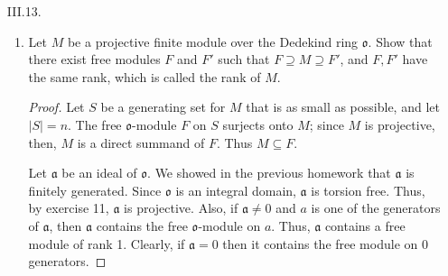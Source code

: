 \documentclass[10pt]{article}
\renewcommand{\a}{\mathfrak{a}}
\renewcommand{\o}{\mathfrak{o}}
\begin{document}
\begin{enumerate}
\begin{enumerate}
\begin{proof}
Consider $\a^{-1} \rightarrow a^{\vee}$ given by $b \mapsto m_b$, which is clearly injective.  If $f \in \a^{\vee}$, then by the argument in (b) we know $f = m_c$ where $c = a^{-1}f(a)$.  Since $\a^{-1}$ is an $\o$-module, and $f(a) \in \o$, we have $c \in \a^{-1}$.  So we have an isomorphism $\a^{-1} \cong a^{\vee}$.  Therefore, $\a = (\a^{-1})^{-1} \cong \a^{\vee \vee}$.

\end{proof}

\end{enumerate}
\item[III.13.]
\begin{enumerate}
\item Let $M$ be a projective finite module over the Dedekind ring $\o$.  Show that there exist free modules $F$ and $F'$ such that $F \supseteq M \supseteq F'$, and $F,F'$ have the same rank, which is called the rank of $M$.

\begin{proof}

Let $S$ be a generating set for $M$ that is as small as possible, and let $|S| = n$.  The free $\o$-module $F$ on $S$ surjects onto $M$; since $M$ is projective, then, $M$ is a direct summand of $F$.  Thus $M \subseteq F$.

Let $\a$ be an ideal of $\o$.  We showed in the previous homework that $\a$ is finitely generated.  Since $\o$ is an integral domain, $\a$ is torsion free.  Thus, by exercise 11, $\a$ is projective.  Also, if $\a \neq 0$ and $a$ is one of the generators of $\a$, then $\a$ contains the free $\o$-module on $a$.  Thus, $\a$ contains a free module of rank 1.  Clearly, if $\a = 0$ then it contains the free module on 0 generators.


\end{proof}
\end{enumerate}
\end{enumerate}
\end{document}
